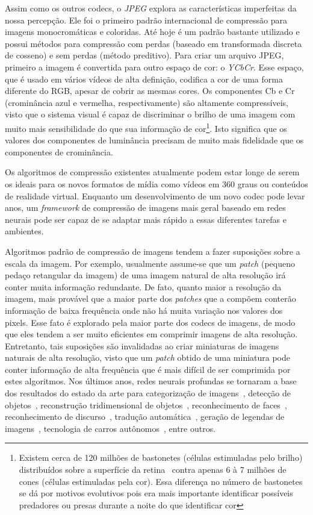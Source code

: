 Assim como os outros codecs, o \textit{JPEG} explora as características imperfeitas da nossa percepção. Ele foi o primeiro padrão internacional de compressão para imagens monocromáticas e coloridas. Até hoje é um padrão bastante utilizado e possui métodos para compressão com perdas (baseado em transformada discreta de cosseno) e sem perdas (método preditivo). Para criar um arquivo JPEG, primeiro a imagem é convertida para outro espaço de cor: o \textit{YCbCr}. Esse espaço, que é usado em vários vídeos de alta definição, codifica a cor de uma forma diferente do RGB, apesar de cobrir as mesmas cores. Os componentes Cb e Cr (crominância azul e vermelha, respectivamente) são altamente compressíveis, visto que o sistema visual é capaz de discriminar o brilho de uma imagem com muito mais sensibilidade do que sua informação de cor\footnote{Existem cerca de 120 milhões de bastonetes (células estimuladas pelo brilho) distribuídos sobre a superfície da retina~\cite{olho} contra apenas 6 à 7 milhões de cones (células estimuladas pela cor). Essa diferença no número de bastonetes se dá por motivos evolutivos pois era mais importante identificar possíveis predadores ou presas durante a noite do que identificar cor}. Isto significa que os valores dos componentes de luminância precisam de muito mais fidelidade que os componentes de crominância.

Os algoritmos de compressão existentes atualmente podem estar longe de serem os ideais para os novos formatos de mídia como vídeos em 360 graus ou conteúdos de realidade virtual. Enquanto um desenvolvimento de um novo codec pode levar anos, um \textit{framework} de compressão de imagens mais geral baseado em redes neurais pode ser capaz de se adaptar mais rápido a essas diferentes tarefas e ambientes.

Algoritmos padrão de compressão de imagens tendem a fazer suposições sobre a escala da imagem. Por exemplo, usualmente assume-se que um \textit{patch} (pequeno pedaço retangular da imagem) de uma imagem natural de alta resolução irá conter muita informação redundante. De fato, quanto maior a resolução da imagem, mais provável que a maior parte dos \textit{patches} que a compõem conterão informação de baixa frequência onde não há muita variação nos valores dos pixels. Esse fato é explorado pela maior parte dos codecs de imagens, de modo que eles tendem a ser muito eficientes em comprimir imagens de alta resolução. Entretanto, tais suposições são invalidadas ao criar miniaturas de imagens naturais de alta resolução, visto que um \textit{patch} obtido de uma miniatura pode conter informação de alta frequência que é mais difícil de ser comprimida por estes algoritmos.
Nos últimos anos, redes neurais profundas se tornaram a base dos resultados do estado da arte para categorização de imagens~\cite{simonyan}, detecção de objetos~\cite{girshick2014rich}, reconstrução tridimensional de objetos~\cite{choy20163d}, reconhecimento de faces~\cite{deepface}, reconhecimento de discurso~\cite{graves}, tradução automática~\cite{sequence}, geração de legendas de imagens~\cite{vinyals2015show}, tecnologia de carros autônomos~\cite{huval2015empirical}, entre outros. 

